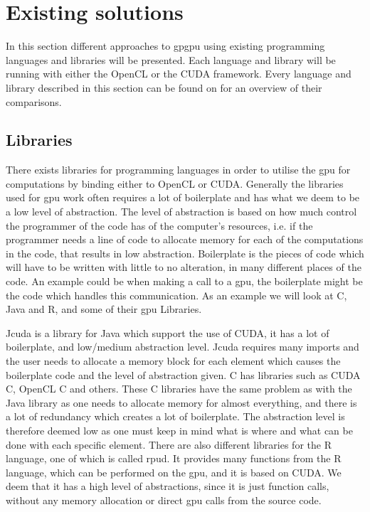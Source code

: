 \section{Existing solutions} %
\label{sec:state_of_the_art}
In this section different approaches to \acrshort{gpgpu} using existing programming languages and libraries will be presented.
Each language and library will be running with either the OpenCL or the CUDA framework.
Every language and library described in this section can be found on  for an overview of their comparisons.
      
\subsection{Libraries} 
There exists libraries for programming languages in order to utilise the \acrshort{gpu} for computations by binding either to OpenCL or CUDA.
Generally the libraries used for \acrshort{gpu} work often requires a lot of boilerplate and has what we deem to be a low level of abstraction.
The level of abstraction is based on how much control the programmer of the code has of the computer's resources, i.e. if the programmer needs a line of code to allocate memory for each of the computations in the code, that results in low abstraction.
Boilerplate is the pieces of code which will have to be written with little to no alteration, in many different places of the code.
An example could be when making a call to a \acrshort{gpu}, the boilerplate might be the code which handles this communication.
As an example we will look at C, Java and R, and some of their \acrshort{gpu} Libraries.

Jcuda is a library for Java which support the use of CUDA, it has a lot of boilerplate, and low/medium abstraction level.\citep{Java_library}
Jcuda requires many imports and the user needs to allocate a memory block for each element which causes the boilerplate code and the level of abstraction given.\citep{Java_malloc}
C has libraries such as CUDA C, OpenCL C and others.
These C libraries have the same problem as with the Java library as one needs to allocate memory for almost everything, and there is a lot of redundancy which creates a lot of boilerplate.
The abstraction level is therefore deemed low as one must keep in mind what is where and what can be done with each specific element.\citep{C_CUDA} 
There are also different libraries for the R language, one of which is called rpud.
It provides many functions from the R language, which can be performed on the \acrshort{gpu}, and it is based on CUDA.
We deem that it has a high level of abstractions, since it is just function calls, without any memory allocation or direct \acrshort{gpu} calls from the source code.\citep{Rcuda} 

